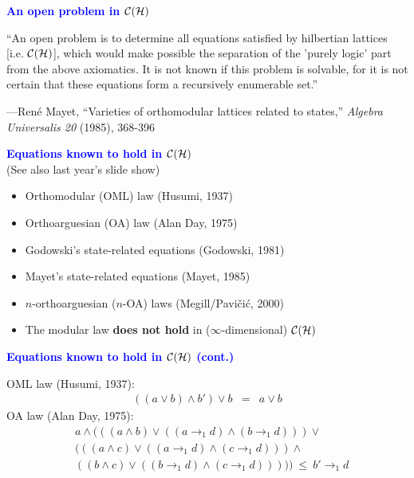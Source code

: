 \documentclass{slides}
\begin{document}
\begin{slide}

\begin{center}
\textcolor{blue}{\textbf{An open problem in ${\cal C}({\cal H})$}}
\end{center}

``An open problem is to determine all equations satisfied by hilbertian
lattices [i.e.  ${\cal C}({\cal H})$], which would make possible the
separation of the 'purely logic' part from the above axiomatics.  It is
not known if this problem is solvable, for it is not certain that these
equations form a recursively enumerable set.''

---Ren\'e Mayet, ``Varieties of orthomodular lattices related to states,''
{\em Algebra Universalis 20} (1985), 368-396

\end{slide}
\begin{slide}

\begin{center}
\textcolor{blue}{\textbf{Equations known to hold in ${\cal C}({\cal H})$}} \\
(See also last year's slide show)
\end{center}

\begin{itemize}
\item Orthomodular (OML) law (Husumi, 1937)
\item Orthoarguesian (OA) law (Alan Day, 1975)
\item Godowski's state-related equations (Godowski, 1981)
\item Mayet's state-related equations (Mayet, 1985)
\item $n$-orthoarguesian ($n$-OA) laws (Megill/Pavi\v ci\'c, 2000)
\item The modular law {\bf does not hold} in ($\infty$-dimensional)
${\cal C}({\cal H})$
\end{itemize}


\end{slide}
\begin{slide}

\begin{center}
\textcolor{blue}{\textbf{Equations known to hold in ${\cal C}({\cal H})$ (cont.)}} \\
\end{center}

OML law (Husumi, 1937):
\begin{eqnarray}
((a\vee b)\wedge b')\vee b &=& a\vee b
\end{eqnarray}
OA law (Alan Day, 1975):
\begin{eqnarray}
 & a\wedge
   (( (a\wedge b) \vee ((a\to_1 d)\wedge (b\to_1 d)) )\vee     \nonumber\\
 & (( (a\wedge c) \vee ((a\to_1 d)\wedge (c\to_1 d)) )\wedge   \nonumber\\
 &  ( (b\wedge c) \vee ((b\to_1 d)\wedge (c\to_1 d)) )))\ \le\ b'\to_1 d
\end{eqnarray}

\end{slide}
\end{document}
